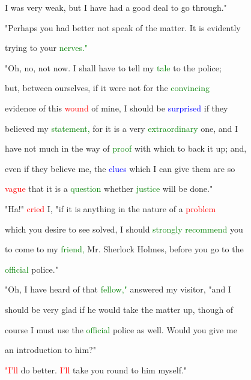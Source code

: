  I was very weak, but I have had a \textcolor{BurntOrange}{good} \textcolor{BurntOrange}{deal} to go through."



 "Perhaps you had better not speak of the matter. It is evidently

 trying to your \textcolor{green}{nerves."}



 "Oh, no, not now. I shall have to tell my \textcolor{green}{tale} to the \textcolor{BurntOrange}{police;}

 but, between ourselves, if it were not for the \textcolor{green}{convincing}

 evidence of this \textcolor{red}{wound} of mine, I should be \textcolor{blue}{surprised} if they

 believed my \textcolor{green}{statement,} for it is a very \textcolor{green}{extraordinary} one, and I

 have not much in the way of \textcolor{green}{proof} with which to back it up; and,

 even if they believe me, the \textcolor{blue}{clues} which I can give them are so

 \textcolor{red}{vague} that it is a \textcolor{green}{question} whether \textcolor{green}{justice} will be done."



 "Ha!" \textcolor{red}{cried} I, "if it is anything in the nature of a \textcolor{red}{problem}

 which you desire to see solved, I should \textcolor{green}{strongly} \textcolor{green}{recommend} you

 to come to my \textcolor{green}{friend,} Mr. Sherlock Holmes, before you go to the

 \textcolor{green}{official} \textcolor{BurntOrange}{police."}



 "Oh, I have heard of that \textcolor{green}{fellow,"} answered my \textcolor{BurntOrange}{visitor,} "and I

 should be very \textcolor{BurntOrange}{glad} if he would take the matter up, though of

 course I must use the \textcolor{green}{official} \textcolor{BurntOrange}{police} as well. Would you give me

 an introduction to him?"



 \textcolor{red}{"I'll} do better. \textcolor{red}{I'll} take you round to him myself."



